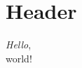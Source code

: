\documentclass[a4paper,11pt]{article} %
\begin{document}
      \section{Header}
      \textit{Hello},\\ world! 
\end{document}
